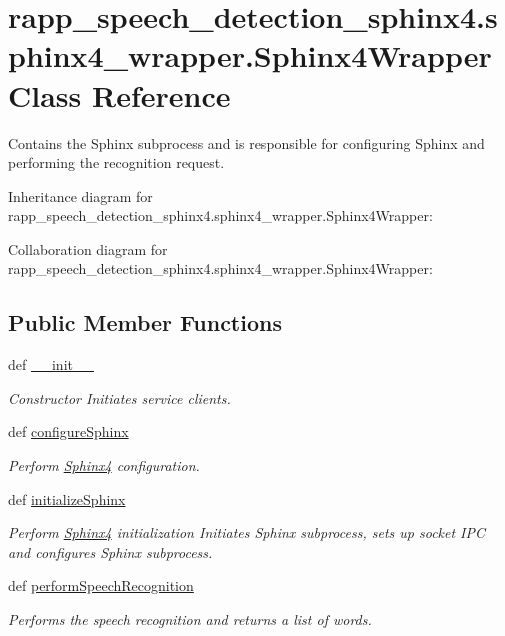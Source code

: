 \hypertarget{classrapp__speech__detection__sphinx4_1_1sphinx4__wrapper_1_1Sphinx4Wrapper}{\section{rapp\-\_\-speech\-\_\-detection\-\_\-sphinx4.\-sphinx4\-\_\-wrapper.\-Sphinx4\-Wrapper Class Reference}
\label{classrapp__speech__detection__sphinx4_1_1sphinx4__wrapper_1_1Sphinx4Wrapper}
}


Contains the Sphinx subprocess and is responsible for configuring Sphinx and performing the recognition request.  




Inheritance diagram for rapp\-\_\-speech\-\_\-detection\-\_\-sphinx4.\-sphinx4\-\_\-wrapper.\-Sphinx4\-Wrapper\-:


Collaboration diagram for rapp\-\_\-speech\-\_\-detection\-\_\-sphinx4.\-sphinx4\-\_\-wrapper.\-Sphinx4\-Wrapper\-:
\subsection*{Public Member Functions}
\begin{DoxyCompactItemize}
\item 
def \hyperlink{classrapp__speech__detection__sphinx4_1_1sphinx4__wrapper_1_1Sphinx4Wrapper_a540295a971600831c3b36968c32ad842}{\-\_\-\-\_\-init\-\_\-\-\_\-}
\begin{DoxyCompactList}\small\item\em Constructor Initiates service clients. \end{DoxyCompactList}\item 
def \hyperlink{classrapp__speech__detection__sphinx4_1_1sphinx4__wrapper_1_1Sphinx4Wrapper_a0629ff048d1714cc7fe581a39375afc5}{configure\-Sphinx}
\begin{DoxyCompactList}\small\item\em Perform \hyperlink{classSphinx4}{Sphinx4} configuration. \end{DoxyCompactList}\item 
def \hyperlink{classrapp__speech__detection__sphinx4_1_1sphinx4__wrapper_1_1Sphinx4Wrapper_a9577435dcbae5622e390c5b5441be0e7}{initialize\-Sphinx}
\begin{DoxyCompactList}\small\item\em Perform \hyperlink{classSphinx4}{Sphinx4} initialization Initiates Sphinx subprocess, sets up socket I\-P\-C and configures Sphinx subprocess. \end{DoxyCompactList}\item 
def \hyperlink{classrapp__speech__detection__sphinx4_1_1sphinx4__wrapper_1_1Sphinx4Wrapper_af43486249bab4de044fdccb7d43e8966}{perform\-Speech\-Recognition}
\begin{DoxyCompactList}\small\item\em Performs the speech recognition and returns a list of words. \end{DoxyCompactList}\end{DoxyCompactItemize}
